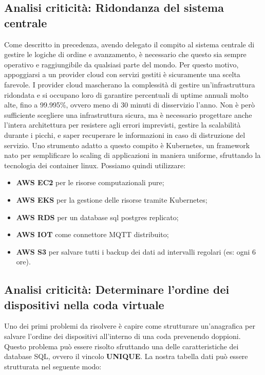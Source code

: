 \documentclass[a4paper, titlepage, 12pt, openright, twoside]{book}
\begin{document}
\subsection{Analisi criticità: Ridondanza del sistema centrale}

Come descritto in precedenza, avendo delegato il compito al sistema centrale di gestire le logiche di ordine e avanzamento, è necessario che questo sia sempre operativo
e raggiungibile da qualsiasi parte del mondo. Per questo motivo, appoggiarsi a un provider cloud con servizi gestiti è sicuramente una scelta farevole. I provider cloud mascherano
la complessità di gestire un'infrastruttura ridondata e si occupano loro di garantire percentuali di uptime annuali molto alte, fino a 99.995\%, ovvero meno di 30 minuti di disservizio l'anno. Non è però sufficiente scegliere una infrastruttura sicura, ma è necessario progettare anche l'intera architettura per resistere agli errori imprevisti, gestire la scalabilità durante i picchi, e saper recuperare le informazioni in caso di distruzione del servizio. Uno strumento adatto a questo compito è Kubernetes, un framework nato per semplificare lo scaling di applicazioni in maniera uniforme, sfruttando la tecnologia dei container linux. Possiamo quindi utilizzare:
\begin{itemize}
	\item \textbf{AWS EC2} per le risorse computazionali pure;
	\item \textbf{AWS EKS} per la gestione delle risorse tramite Kubernetes;
	\item \textbf{AWS RDS} per un database sql postgres replicato;
	\item \textbf{AWS IOT} come connettore MQTT distribuito;
	\item \textbf{AWS S3} per salvare tutti i backup dei dati ad intervalli regolari (es: ogni 6 ore).
\end{itemize}

\subsection{Analisi criticità: Determinare l'ordine dei dispositivi nella coda virtuale}

Uno dei primi problemi da risolvere è capire come strutturare un'anagrafica per salvare l'ordine dei dispositivi all'interno di una coda prevenendo doppioni.
Questo problema può essere risolto sfruttando una delle caratteristiche dei database SQL, ovvero il vincolo \textbf{UNIQUE}.
La nostra tabella dati può essere strutturata nel seguente modo:
\end{document}
